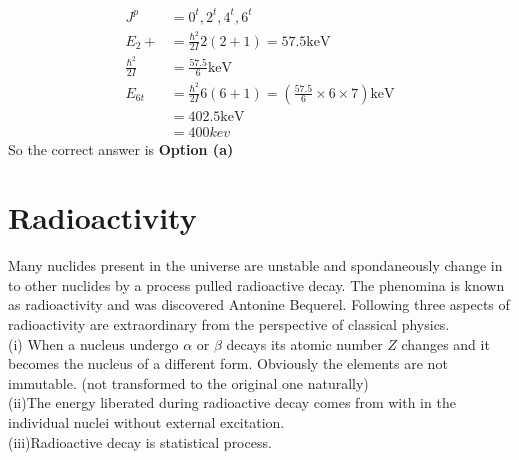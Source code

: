 \begin{answer}
	\begin{align*}
	J^{p}&=0^{t}, 2^{t}, 4^{t}, 6^{t}\\
	E_{2}+&=\frac{\hbar^{2}}{2 I} 2(2+1)=57.5 \mathrm{keV}\\
	\frac{\hbar^{2}}{2 I}&=\frac{57.5}{6} \mathrm{keV}\\
	E_{6 t}&=\frac{\hbar^{2}}{2 I} 6(6+1)=\left(\frac{57.5}{6} \times 6 \times 7\right) \mathrm{keV}\\
	&=402.5 \mathrm{keV}\\
	&=400kev
	\end{align*}
	So the correct answer is \textbf{Option (a)}
\end{answer}















\section{Radioactivity}
Many nuclides present in the universe are unstable and spondaneously change in to other nuclides by a process pulled radioactive decay. The phenomina is known as radioactivity and was discovered Antonine Bequerel. Following three aspects of radioactivity are extraordinary from the perspective of classical physics.\\
(i) \quad When a nucleus undergo $\alpha$ or $\beta$ decays its atomic number $Z$ changes and it becomes the nucleus of a different form. Obviously the elements are not immutable. (not transformed to the original one naturally)\\
(ii)\quad The energy liberated during radioactive decay comes from with in the individual nuclei without external excitation.\\
(iii)\quad Radioactive decay is statistical process.
